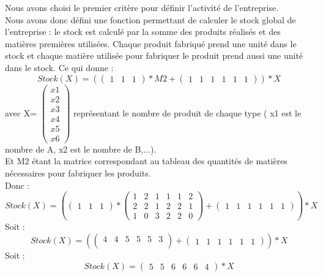 \documentclass{article}
\begin{document}
Nous avons choisi le premier critère pour définir l'activité de l'entreprise. \\
Nous avons donc défini une fonction permettant de calculer le stock global de l'entreprise : le stock est calculé par la somme des produits réalisés et des matières premières utilisées. Chaque produit fabriqué prend une unité dans le stock et chaque matière utilisée pour fabriquer le produit prend aussi une unité dans le stock. Ce qui donne :
\[
   Stock(X) =  
   (
   \begin{pmatrix} 
   1 & 1 & 1 
   \end{pmatrix}
   * M2 +
   \begin{pmatrix} 
   1 & 1 & 1 & 1 & 1 & 1
   \end{pmatrix} 
   )*X
   \]
 avec X= $\begin{pmatrix} 
   x1 \\ 
   x2 \\
   x3 \\
   x4 \\
   x5 \\ 
   x6 
  \end{pmatrix}$ représentant le nombre de produit de chaque type ( x1 est le nombre de A, x2 est le nombre de B,...). \\
  Et M2 étant la matrice correspondant au tableau des quantités de matières nécessaires pour fabriquer les produits. \\
  
Donc :
\[ 
   Stock(X) =  
   (
   \begin{pmatrix} 
   1 & 1 & 1 
   \end{pmatrix}
   *
   \begin{pmatrix} 
   1 & 2 & 1 & 1 & 1 & 2 \\ 
   2 & 2 & 1 & 2 & 2 & 1 \\
   1 & 0 & 3 & 2 & 2 & 0
   \end{pmatrix} 
   +
   \begin{pmatrix} 
   1 & 1 & 1 & 1 & 1 & 1
   \end{pmatrix} 
   )*X
\]
Soit :
\[ 
   Stock(X) =  
   (
   \begin{pmatrix} 
   4 & 4 & 5 & 5 & 5 & 3 \\
   \end{pmatrix}
   +
   \begin{pmatrix} 
   1 & 1 & 1 & 1 & 1 & 1
   \end{pmatrix} 
   )*X
\]
Soit :
\[ 
   Stock(X) =  
   \begin{pmatrix} 
   5 & 5 & 6 & 6 & 6 & 4
   \end{pmatrix}
	*X
\]
\end{document}
